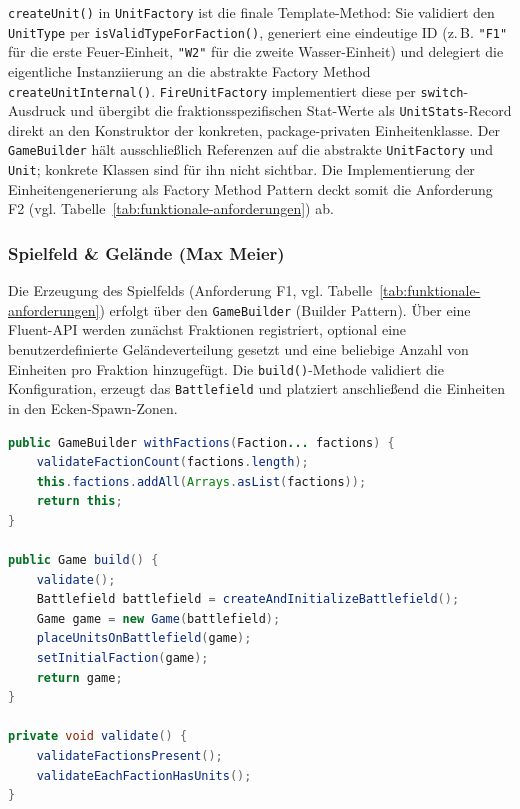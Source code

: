 \texttt{createUnit()} in \texttt{UnitFactory} ist die finale Template-Method: Sie validiert den \texttt{UnitType} per \texttt{isValidTypeForFaction()}, generiert eine eindeutige ID (z.\,B. \texttt{"F1"} für die erste Feuer-Einheit, \texttt{"W2"} für die zweite Wasser-Einheit) und delegiert die eigentliche Instanziierung an die abstrakte Factory Method \texttt{createUnitInternal()}.
\texttt{FireUnitFactory} implementiert diese per \texttt{switch}-Ausdruck und übergibt die fraktionsspezifischen Stat-Werte als \texttt{UnitStats}-Record direkt an den Konstruktor der konkreten, package-privaten Einheitenklasse.
Der \texttt{GameBuilder} hält ausschließlich Referenzen auf die abstrakte \texttt{UnitFactory} und \texttt{Unit}; konkrete Klassen sind für ihn nicht sichtbar.
Die Implementierung der Einheitengenerierung als Factory Method Pattern deckt somit die Anforderung F2 (vgl. Tabelle~\ref{tab:funktionale-anforderungen}) ab.

\subsubsection{Spielfeld \& Gelände (Max Meier)}
\label{subsec:spielfeld-gelaende}

Die Erzeugung des Spielfelds (Anforderung F1, vgl. Tabelle~\ref{tab:funktionale-anforderungen}) erfolgt über den \texttt{GameBuilder} (Builder Pattern).
Über eine Fluent-API werden zunächst Fraktionen registriert, optional eine benutzerdefinierte Geländeverteilung gesetzt und
eine beliebige Anzahl von Einheiten pro Fraktion hinzugefügt.
Die \texttt{build()}-Methode validiert die Konfiguration, erzeugt das \texttt{Battlefield} und platziert anschließend die
Einheiten in den Ecken-Spawn-Zonen.

\begin{lstlisting}[language=Java, caption={GameBuilder -- Fluent-API und Build-Methode}, label={lst:builder-build}]
public GameBuilder withFactions(Faction... factions) {
    validateFactionCount(factions.length);
    this.factions.addAll(Arrays.asList(factions));
    return this;
}

public Game build() {
    validate();
    Battlefield battlefield = createAndInitializeBattlefield();
    Game game = new Game(battlefield);
    placeUnitsOnBattlefield(game);
    setInitialFaction(game);
    return game;
}

private void validate() {
    validateFactionsPresent();
    validateEachFactionHasUnits();
}
\end{lstlisting}

